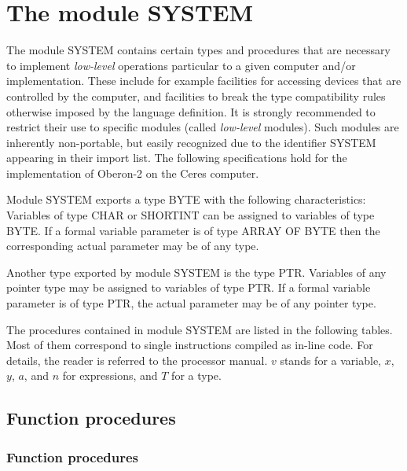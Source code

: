 \section{The module SYSTEM}\label{o2r:SYSTEM}

The module SYSTEM contains certain types and procedures that are necessary
to implement {\em low-level} operations particular to a given computer and/or
implementation. These include for example facilities for accessing
devices that are controlled by the computer, and facilities to break
the type compatibility rules otherwise imposed by the language definition.
It is strongly recommended to restrict their use to specific modules
(called {\em low-level} modules). Such modules are inherently non-portable,
but easily recognized due to the identifier SYSTEM appearing in their
import list. The following specifications hold for the implementation
of Oberon-2 on the Ceres computer.

Module SYSTEM exports a type BYTE with the following characteristics:
Variables of type CHAR or SHORTINT can be assigned to variables of
type BYTE. If a formal variable parameter is of type ARRAY OF BYTE
then the corresponding actual parameter may be of any type.

Another type exported by module SYSTEM is the type PTR. Variables
of any pointer type may be assigned to variables of type PTR. If a
formal variable parameter is of type PTR, the actual parameter may
be of any pointer type.

The procedures contained in module SYSTEM are listed in the following
tables. Most of them correspond to single instructions compiled as
in-line code. For details, the reader is referred to the processor
manual. $v$ stands for a variable, $x$, $y$, $a$, and $n$ for expressions, and
$T$ for a type.

\ifonline
\subsection{Function procedures}
\else
\subsubsection{Function procedures}
\fi

